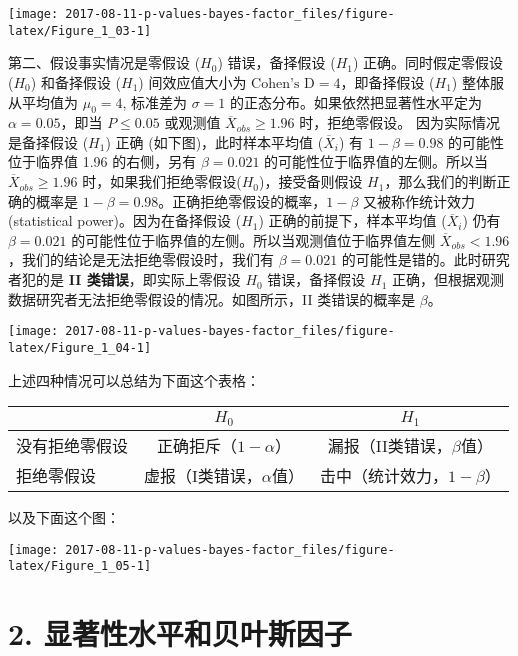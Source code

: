 \documentclass[]{article}
\begin{document}
\begin{center}\texttt{[image: 2017-08-11-p-values-bayes-factor\_files/figure-latex/Figure\_1\_03-1]} \end{center}

第二、假设事实情况是零假设 (\(H_0\)) 错误，备择假设 (\(H_1\))
正确。同时假定零假设 (\(H_0\)) 和备择假设 (\(H_1\)) 间效应值大小为
\(\text{Cohen's D} = 4\)，即备择假设 (\(H_1\)) 整体服从平均值为
\(\mu_0 = 4\), 标准差为 \(\sigma = 1\)
的正态分布。如果依然把显著性水平定为 \(\alpha=0.05\)，即当
\(P \leq 0.05\) 或观测值 \(\overline{X}_{obs} \geq 1.96\)
时，拒绝零假设。 因为实际情况是备择假设 (\(H_1\)) 正确
(如下图)，此时样本平均值 (\(\overline{X}_i\)) 有 \(1-\beta=0.98\)
的可能性位于临界值 1.96 的右侧，另有 \(\beta = 0.021\)
的可能性位于临界值的左侧。所以当 \(\overline{X}_{obs} \geq 1.96\)
时，如果我们拒绝零假设(\(H_0\))，接受备则假设
\(H_1\)，那么我们的判断正确的概率是
\(1-\beta = 0.98\)。正确拒绝零假设的概率，\(1-\beta\) 又被称作统计效力
(statistical power)。因为在备择假设 (\(H_1\)) 正确的前提下，样本平均值
(\(\overline{X}_i\)) 仍有 \(\beta = 0.021\)
的可能性位于临界值的左侧。所以当观测值位于临界值左侧
\(\overline{X}_{obs} < 1.96\)，我们的结论是无法拒绝零假设时，我们有
\(\beta = 0.021\) 的可能性是错的。此时研究者犯的是 \textbf{II
类错误}，即实际上零假设 \(H_0\) 错误，备择假设 \(H_1\)
正确，但根据观测数据研究者无法拒绝零假设的情况。如图所示，II
类错误的概率是 \(\beta\)。

\begin{center}\texttt{[image: 2017-08-11-p-values-bayes-factor\_files/figure-latex/Figure\_1\_04-1]} \end{center}

上述四种情况可以总结为下面这个表格：

\begin{longtable}[]{@{}lcc@{}}
\toprule
& \(H_0\) & \(H_1\)\tabularnewline
\midrule
\endhead
没有拒绝零假设 & 正确拒斥（\(1-\alpha\)） &
漏报（II类错误，\(\beta\)值）\tabularnewline
拒绝零假设 & 虚报（I类错误，\(\alpha\)值） &
击中（统计效力，\(1-\beta\)）\tabularnewline
\bottomrule
\end{longtable}

以及下面这个图：

\begin{center}\texttt{[image: 2017-08-11-p-values-bayes-factor\_files/figure-latex/Figure\_1\_05-1]} \end{center}

\hypertarget{bf}{%
\section{2. 显著性水平和贝叶斯因子}\label{bf}}
\end{document}
